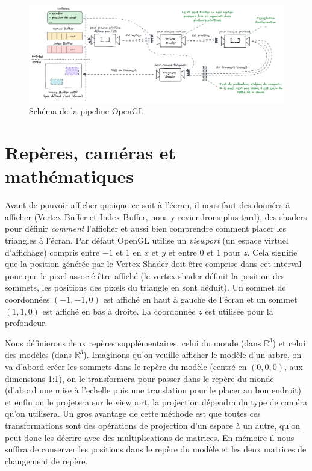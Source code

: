 \documentclass{EPUProjetDi}
\begin{document}
\begin{figure}[th]
	\centering
	\includegraphics[scale=.3]{opengl_pipeline}
	\caption{Schéma de la pipeline OpenGL}
	\label{fig:opengl_pipeline}
\end{figure}

\section{Repères, caméras et mathématiques}

Avant de pouvoir afficher quoique ce soit à l'écran, il nous faut des données à afficher (Vertex Buffer et Index Buffer, nous y reviendrons \hyperref[sec:instanced_rendering]{plus tard}), des shaders pour définir \textit{comment} l'afficher et aussi bien comprendre comment placer les triangles à l'écran.
Par défaut OpenGL utilise un \textit{viewport} (un espace virtuel d'affichage) compris entre $-1$ et $1$ en $x$ et $y$ et entre $0$ et $1$ pour $z$. Cela signifie que la position générée par le Vertex Shader doit être comprise dans cet interval pour que le pixel associé être affiché (le vertex shader définit la position des sommets, les positions des pixels du triangle en sont déduit). Un sommet de coordonnées $(-1,-1,0)$ est affiché en haut à gauche de l'écran et un sommet $(1,1,0)$ est affiché en bas à droite. La coordonnée $z$ est utilisée pour la profondeur.
\par
Nous définierons deux repères supplémentaires, celui du monde (dans $\mathbb{R}^3$) et celui des modèles (dans $\mathbb{R}^3$). Imaginons qu'on veuille afficher le modèle d'un arbre, on va d'abord créer les sommets dans le repère du modèle (centré en $(0,0,0)$, aux dimensions 1:1), on le transformera pour passer dans le repère du monde (d'abord une mise à l'echelle puis une translation pour le placer au bon endroit) et enfin on le projetera sur le viewport, la projection dépendra du type de caméra qu'on utilisera.
Un gros avantage de cette méthode est que toutes ces transformations sont des opérations de projection d'un espace à un autre, qu'on peut donc les décrire avec des multiplications de matrices. En mémoire il nous suffira de conserver les positions dans le repère du modèle et les deux matrices de changement de repère.
\end{document}
